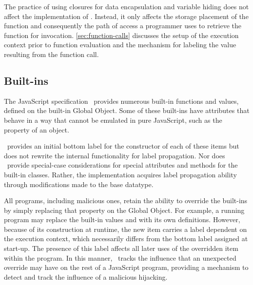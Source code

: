 The practice of using closures for data encapsulation and variable hiding does not affect the implementation of \FlowCore.
Instead, it only affects the storage placement of the function and consequently the path of access a programmer uses to retrieve the function for invocation.
\autoref{sec:function-calls} discusses the setup of the execution context prior to function evaluation and the mechanism for labeling the value resulting from the function call.

\subsection{Built-ins}

\begin{comment}
 - what to do with arrays, or does this fit better in design considerations?
   : Can coalesce labels on arrays?
   : label bounds checking?
 - object poisoning attack
\end{comment}

The JavaScript specification~\cite{ecma} provides numerous built-in functions and values, defined on the built-in Global Object.
Some of these built-ins have attributes that behave in a way that cannot be emulated in pure JavaScript, such as the  property of an  object.

\FlowCore\ provides an initial bottom label for the constructor of each of these items but does not rewrite the internal functionality for label propagation.
Nor does \FlowCore\ provide special-case considerations for special attributes and methods for the built-in classes.
Rather, the implementation acquires label propagation ability through modifications made to the base  datatype.

All programs, including malicious ones, retain the ability to override the built-ins by simply replacing that property on the Global Object.
For example, a running program may replace the built-in values  and  with its own definitions.
However, because of its construction at runtime, the new item carries a label dependent on the execution context, which necessarily differs from the bottom label assigned at start-up.
The presence of this label affects all later uses of the overridden item within the program.
In this manner, \FlowCore\ tracks the influence that an unexpected override may have on the rest of a JavaScript program, providing a mechanism to detect and track the influence of a malicious hijacking.

